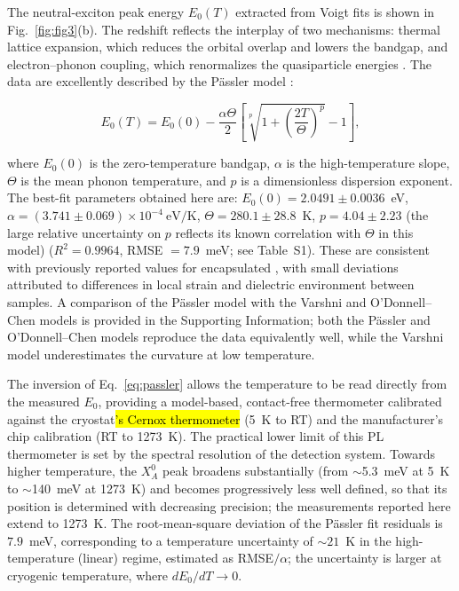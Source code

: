 \documentclass[letterpaper]{article}
\DeclareRobustCommand{\revB}[1]{\hl{#1}}
\begin{document}
The neutral-exciton peak energy $E_0(T)$ extracted from Voigt fits is shown in
Fig.~\ref{fig:fig3}(b). The redshift reflects the interplay of two mechanisms:
thermal lattice expansion, which reduces the orbital overlap and lowers the
bandgap, and electron--phonon coupling, which renormalizes the quasiparticle
energies \cite{passler-1999}. The data are excellently described by the
Pässler model \cite{passler-1997,passler-1999}:

\begin{equation}
E_0(T) = E_0(0) - \frac{\alpha \Theta}{2}
\left[ \sqrt[p]{1 + \left(\frac{2T}{\Theta}\right)^p} - 1 \right],
\label{eq:passler}
\end{equation}

where $E_0(0)$ is the zero-temperature bandgap, $\alpha$ is the high-temperature
slope, $\Theta$ is the mean phonon temperature, and $p$ is a dimensionless
dispersion exponent. The best-fit parameters obtained here are:
$E_0(0) = 2.0491 \pm 0.0036$~eV, $\alpha = (3.741 \pm 0.069)\times10^{-4}~\mathrm{eV/K}$,
$\Theta = 280.1 \pm 28.8$~K, $p = 4.04 \pm 2.23$ (the large relative uncertainty
on $p$ reflects its known correlation with $\Theta$ in this model)
($R^2 = 0.9964$, RMSE $= 7.9$~meV;
see Table~S1). These are consistent with previously reported values
for encapsulated  \cite{lee-2026d}, with small deviations attributed to
differences in local strain and dielectric environment between samples. A
comparison of the Pässler model with the Varshni and O'Donnell--Chen models is
provided in the Supporting Information; both the Pässler and O'Donnell--Chen
models reproduce the data equivalently well, while the Varshni model
underestimates the curvature at low temperature.

The inversion of Eq.~\eqref{eq:passler} allows the temperature to be read
directly from the measured $E_0$, providing a model-based, contact-free
thermometer calibrated against the cryostat\revB{'s Cernox thermometer} (5~K to RT) and the manufacturer's
chip calibration (RT to 1273~K). The practical lower limit of this PL
thermometer is set by the spectral resolution of the detection system. Towards
higher temperature, the $X_A^0$ peak broadens substantially (from
$\sim$5.3~meV at 5~K to $\sim$140~meV at 1273~K) and becomes progressively less
well defined, so that its position is determined with decreasing precision;
the measurements reported here extend to 1273~K.
The root-mean-square deviation of the Pässler fit residuals is
$7.9$~meV, corresponding to a temperature uncertainty of $\sim 21$~K in the
high-temperature (linear) regime, estimated as RMSE$/\alpha$; the uncertainty
is larger at cryogenic temperature, where $dE_0/dT \to 0$.
\end{document}
